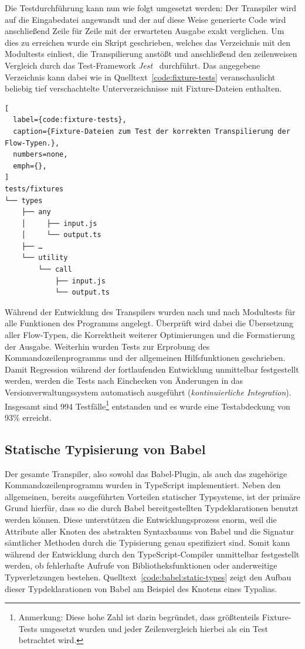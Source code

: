 {Die Testdurchführung kann nun wie folgt umgesetzt werden: Der Transpiler wird auf die Eingabedatei angewandt und der auf diese Weise generierte Code wird anschließend Zeile für Zeile mit der erwarteten Ausgabe exakt verglichen. Um dies zu erreichen wurde ein Skript geschrieben, welches das Verzeichnis mit den Modultests einliest, die Transpilierung anstößt und anschließend den zeilenweisen Vergleich durch das Test-Framework \textit{Jest}~\autocite{SOFTWARE:JEST} durchführt. Das angegebene Verzeichnis kann dabei wie in Quelltext~\ref{code:fixture-tests} veranschaulicht beliebig tief verschachtelte Unterverzeichnisse mit Fixture-Dateien enthalten.

\begin{lstlisting}[
  label={code:fixture-tests},
  caption={Fixture-Dateien zum Test der korrekten Transpilierung der Flow-Typen.},
  numbers=none,
  emph={},
]
tests/fixtures
└── types
    ├── any
    │     ├── input.js
    │     └── output.ts
    ├── …
    └── utility
        └── call
            ├── input.js
            └── output.ts
\end{lstlisting}

Während der Entwicklung des Transpilers wurden nach und nach Modultests für alle Funktionen des Programms angelegt. Überprüft wird dabei die Übersetzung aller Flow-Typen, die Korrektheit weiterer Optimierungen und die Formatierung der Ausgabe. Weiterhin wurden Tests zur Erprobung des Kommandozeilenprogramms und der allgemeinen Hilfsfunktionen geschrieben. Damit Regression während der fortlaufenden Entwicklung unmittelbar festgestellt werden, werden die Tests nach Einchecken von Änderungen in das Versionverwaltungssystem automatisch ausgeführt (\textit{kontinuierliche Integration}). Insgesamt sind 994 Testfälle\footnote{Anmerkung: Diese hohe Zahl ist darin begründet, dass größtenteils Fixture-Tests umgesetzt wurden und jeder Zeilenvergleich hierbei als ein Test betrachtet wird.} entstanden und es wurde eine Testabdeckung von 93\% erreicht.

\subsection{Statische Typisierung von Babel}

Der gesamte Transpiler, also sowohl das Babel-Plugin, als auch das zugehörige Kommandozeilenprogramm wurden in TypeScript implementiert. Neben den allgemeinen, bereits ausgeführten Vorteilen statischer Typsysteme, ist der primäre Grund hierfür, dass so die durch Babel bereitgestellten Typdeklarationen benutzt werden können. Diese unterstützen die Entwicklungsprozess enorm, weil die Attribute aller Knoten des abstrakten Syntaxbaums von Babel und die Signatur sämtlicher Methoden durch die Typisierung genau spezifiziert sind. Somit kann während der Entwicklung durch den TypeScript-Compiler unmittelbar festgestellt werden, ob fehlerhafte Aufrufe von Bibliotheksfunktionen oder anderweitige Typverletzungen bestehen. Quelltext~\ref{code:babel:static-types} zeigt den Aufbau dieser Typdeklarationen von Babel am Beispiel des Knotens eines Typalias.

}
